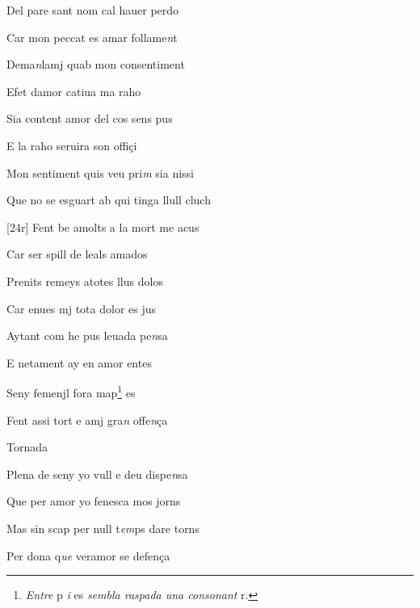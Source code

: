 \documentclass[12pt]{article}
\begin{document}
\begin{estrofa}

 Del pare sant nom cal hauer perdo

 Car mon peccat es amar follame\textit{n}t

 Dema\textit{n}lamj quab mon consentiment

 Efet damor catiua ma raho

 Sia content amor del cos sens pus

 E la raho seruira son offi\c{c}i

 Mon sentiment quis veu pri\textit{m} sia nissi

 Que no se esguart ab qui tinga llull cluch

\end{estrofa}



\begin{estrofa}

 [24r] Fent be amolts a la mort me acus

 Car ser spill de leals amados

 Prenits remeys atotes llus dolos

 Car enues mj tota dolor es jus

 Aytant com he pus leuada pe\textit{n}sa

 E netament ay en amor entes

 Seny femenjl fora map\footnote{\textit{Entre }p\textit{ i} es\textit{
sembla raspada una consonant} r.} es

 Fent assi tort e amj gra\textit{n} offe\textit{n}\c{c}a

\end{estrofa}


\begin{estrofaExtra}%




\begin{tornada}

Tornada

\end{tornada}


\end{estrofaExtra}


\begin{estrofa}

 Plena de seny yo vull e deu dispe\textit{n}sa

 Que per amor yo fenesca mos jorns

 Mas sin scap per null t\textit{em}ps dare torns

 Per dona q\textit{ue} veramor se defen\c{c}a

\end{estrofa}
\end{document}
